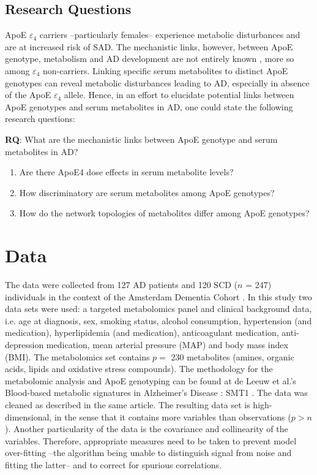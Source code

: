 \documentclass{amsart}
\theoremstyle{plain}
\begin{document}
\newpage
\subsection{Research Questions}
ApoE $\varepsilon_4$ carriers --particularly females-- experience metabolic disturbances and are at increased risk of SAD. The mechanistic links, however, between ApoE genotype, metabolism and AD development are not entirely known \cite{Fernandez-Calle2022APOEDiseases}, more so among $\varepsilon_4$ non-carriers. Linking specific serum metabolites to distinct ApoE genotypes can reveal metabolic disturbances leading to AD, especially in absence of the ApoE $\varepsilon_4$ allele. Hence, in an effort to elucidate potential links between ApoE genotypes and serum metabolites in AD, one could state the following research questions:

\textbf{RQ}: What are the mechanistic links between ApoE genotype and serum metabolites in AD?
\begin{enumerate}
    \item Are there ApoE4 dose effects in serum metabolite levels?
    \item How discriminatory are serum metabolites among ApoE genotypes?
    \item How do the network topologies of metabolites differ among ApoE genotypes?
\end{enumerate}
\clearpage
\section{Data}
The data were collected from 127 AD patients and 120 SCD ($n$ = 247) individuals in the context of the Amsterdam Dementia Cohort \cite{VanDerFlier2018AmsterdamCare, deLeeuw2017Blood-basedDisease}. In this study two data sets were used: a targeted metabolomics panel and clinical background data, i.e. age at diagnosis, sex, smoking status, alcohol consumption, hypertension (and medication), hyperlipidemia (and medication), anticoagulant medication, anti-depression medication, mean arterial pressure (MAP) and body mass index (BMI). The metabolomics set contains $p =$ 230 metabolites (amines, organic acids, lipids and oxidative stress compounds). The methodology for the metabolomic analysis and ApoE genotyping can be found at de Leeuw et al.'s  Blood-based metabolic signatures in Alzheimer's Disease \cite{deLeeuw2017Blood-basedDisease}: SMT1 . The data was cleaned as described in the same article. The resulting data set is high-dimensional, in the sense that it contains more variables than observations ($p > n$). Another particularity of the data is the covariance and collinearity of the variables. Therefore, appropriate measures need to be taken to prevent model over-fitting --the algorithm being unable to distinguish signal from noise and fitting the latter--  and to correct for spurious correlations.
\newpage
\end{document}
